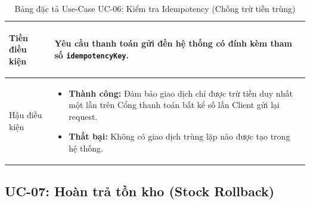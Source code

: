 \documentclass[12pt,a4paper]{article}
\begin{document}
\begin{table}[H]
\begin{tabularx}{\textwidth}{|>{\bfseries\raggedright\arraybackslash}p{3.2cm}|>{\raggedright\arraybackslash}X|}
\hline
Tiền điều kiện & Yêu cầu thanh toán gửi đến hệ thống có đính kèm tham số \texttt{idempotencyKey}. \\
\hline
Hậu điều kiện & 
\begin{itemize}[leftmargin=*,itemsep=2pt,topsep=2pt,parsep=0pt,partopsep=0pt]
    \item \textbf{Thành công:} Đảm bảo giao dịch chỉ được trừ tiền duy nhất một lần trên Cổng thanh toán bất kể số lần Client gửi lại request.
    \item \textbf{Thất bại:} Không có giao dịch trùng lặp nào được tạo trong hệ thống.
\end{itemize} \\
\hline
\end{tabularx}
\caption{Bảng đặc tả Use-Case UC-06: Kiểm tra Idempotency (Chống trừ tiền trùng)}
\label{tab:uc-06}
\end{table}

\subsection{UC-07: Hoàn trả tồn kho (Stock Rollback)}
\end{document}
